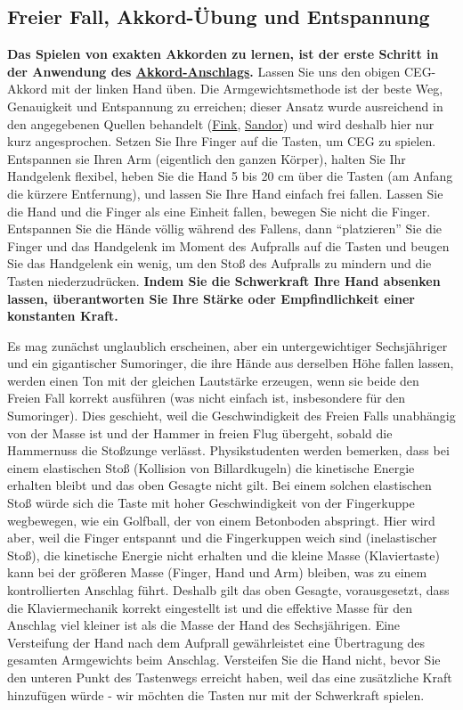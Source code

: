 
\subsection{Freier Fall, Akkord-Übung und Entspannung}
\label{c1ii10}

\textbf{Das Spielen von exakten Akkorden zu lernen, ist der erste Schritt in der Anwendung des \hyperref[c1ii9]{Akkord-Anschlags}.}
Lassen Sie uns den obigen CEG-Akkord mit der linken Hand üben.
Die Armgewichtsmethode ist der beste Weg, Genauigkeit und Entspannung zu erreichen; dieser Ansatz wurde ausreichend in den angegebenen Quellen behandelt (\hyperref[Fink]{Fink}, \hyperref[Sandor]{Sandor}) und wird deshalb hier nur kurz angesprochen.
Setzen Sie Ihre Finger auf die Tasten, um CEG zu spielen.
Entspannen sie Ihren Arm (eigentlich den ganzen Körper), halten Sie Ihr Handgelenk flexibel, heben Sie die Hand 5 bis 20 cm über die Tasten (am Anfang die kürzere Entfernung), und lassen Sie Ihre Hand einfach frei fallen.
Lassen Sie die Hand und die Finger als eine Einheit fallen, bewegen Sie nicht die Finger.
Entspannen Sie die Hände völlig während des Fallens, dann \enquote{platzieren} Sie die Finger und das Handgelenk im Moment des Aufpralls auf die Tasten und beugen Sie das Handgelenk ein wenig, um den Stoß des Aufpralls zu mindern und die Tasten niederzudrücken.
\textbf{Indem Sie die Schwerkraft Ihre Hand absenken lassen, überantworten Sie Ihre Stärke oder Empfindlichkeit einer konstanten Kraft.}

Es mag zunächst unglaublich erscheinen, aber ein untergewichtiger Sechsjähriger und ein gigantischer Sumoringer, die ihre Hände aus derselben Höhe fallen lassen, werden einen Ton mit der gleichen Lautstärke erzeugen, wenn sie beide den Freien Fall korrekt ausführen (was nicht einfach ist, insbesondere für den Sumoringer).
Dies geschieht, weil die Geschwindigkeit des Freien Falls unabhängig von der Masse ist und der Hammer in freien Flug übergeht, sobald die Hammernuss die Stoßzunge verlässt.
Physikstudenten werden bemerken, dass bei einem elastischen Stoß (Kollision von Billardkugeln) die kinetische Energie erhalten bleibt und das oben Gesagte nicht gilt.
Bei einem solchen elastischen Stoß würde sich die Taste mit hoher Geschwindigkeit von der Fingerkuppe wegbewegen, wie ein Golfball, der von einem Betonboden abspringt.
Hier wird aber, weil die Finger entspannt und die Fingerkuppen weich sind (inelastischer Stoß), die kinetische Energie nicht erhalten und die kleine Masse (Klaviertaste) kann bei der größeren Masse (Finger, Hand und Arm) bleiben, was zu einem kontrollierten Anschlag führt.
Deshalb gilt das oben Gesagte, vorausgesetzt, dass die Klaviermechanik korrekt eingestellt ist und die effektive Masse für den Anschlag viel kleiner ist als die Masse der Hand des Sechsjährigen.
Eine Versteifung der Hand nach dem Aufprall gewährleistet eine Übertragung des gesamten Armgewichts beim Anschlag.
Versteifen Sie die Hand nicht, bevor Sie den unteren Punkt des Tastenwegs erreicht haben, weil das eine zusätzliche Kraft hinzufügen würde - wir möchten die Tasten nur mit der Schwerkraft spielen.

